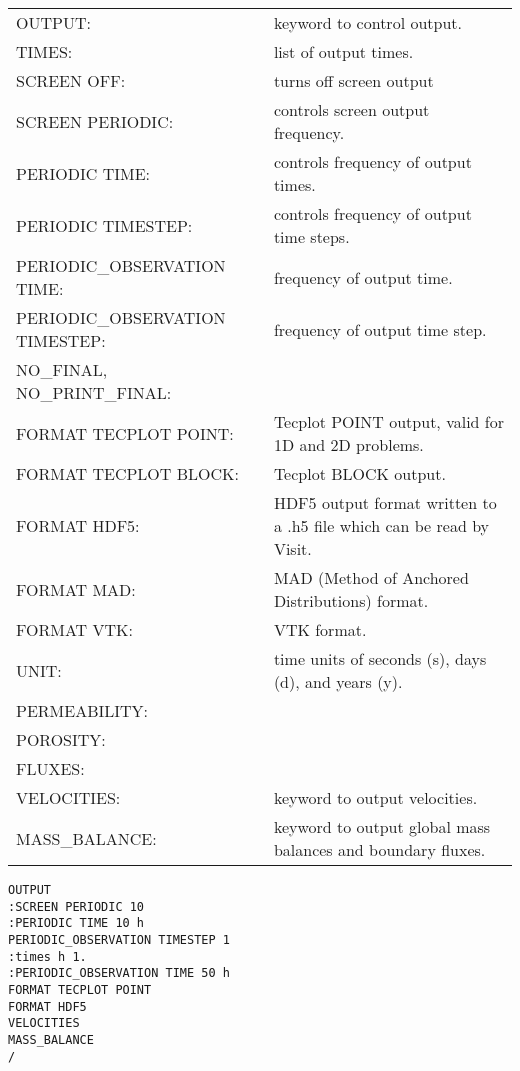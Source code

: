 \documentclass[12pt]{article}
\begin{document}

\begin{center}
\begin{tabularx}{\linewidth}{lX}
OUTPUT: & keyword to control output.\\
TIMES: & list of output times.\\
SCREEN OFF: & turns off screen output\\
SCREEN PERIODIC: & controls screen output frequency.\\
PERIODIC TIME: & controls frequency of output times.\\
PERIODIC TIMESTEP: & controls frequency of output time steps.\\
PERIODIC\_OBSERVATION TIME: & frequency of output time.\\
PERIODIC\_OBSERVATION TIMESTEP: & frequency of output time step.\\
NO\_FINAL, NO\_PRINT\_FINAL: & \\
FORMAT TECPLOT POINT: & Tecplot POINT output, valid for 1D and 2D problems.\\
FORMAT TECPLOT BLOCK: & Tecplot BLOCK output.\\
FORMAT HDF5: & HDF5 output format written to a .h5 file which can be read by Visit.\\
FORMAT MAD: & MAD (Method of Anchored Distributions) format.\\
FORMAT VTK: & VTK format.\\
UNIT: & time units of seconds (s), days (d), and years (y).\\
PERMEABILITY: & \\
POROSITY: & \\
FLUXES: & \\
VELOCITIES: & keyword to output velocities.\\
MASS\_BALANCE: & keyword to output global mass balances and boundary fluxes.
\end{tabularx}
\end{center}


\begin{verbatim}
OUTPUT
:SCREEN PERIODIC 10
:PERIODIC TIME 10 h
PERIODIC_OBSERVATION TIMESTEP 1
:times h 1.
:PERIODIC_OBSERVATION TIME 50 h
FORMAT TECPLOT POINT
FORMAT HDF5
VELOCITIES
MASS_BALANCE
/
\end{verbatim}

\end{document}

